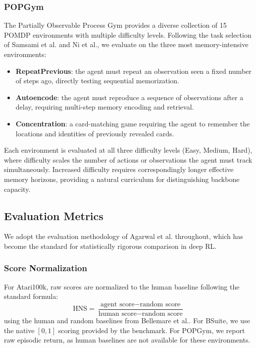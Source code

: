 \documentclass{article}
\begin{document}
\subsubsection{POPGym}
The Partially Observable Process Gym\cite{popgym} provides a diverse
collection of 15 POMDP environments with multiple difficulty levels.
Following the task selection of Samsami et al.\cite{memory} and Ni
et al., we evaluate on the three most memory-intensive environments:
\begin{itemize}
    \item \textbf{RepeatPrevious}: the agent must repeat an
          observation seen a fixed number of steps ago, directly
          testing sequential memorization.
    \item \textbf{Autoencode}: the agent must reproduce a sequence of
          observations after a delay, requiring multi-step memory
          encoding and retrieval.
    \item \textbf{Concentration}: a card-matching game requiring the
          agent to remember the locations and identities of
          previously revealed cards.
\end{itemize}
Each environment is evaluated at all three difficulty levels (Easy,
Medium, Hard), where difficulty scales the number of actions or
observations the agent must track simultaneously. Increased
difficulty requires correspondingly longer effective memory horizons,
providing a natural curriculum for distinguishing backbone capacity.

\subsection{Evaluation Metrics}
We adopt the evaluation methodology of Agarwal et al.\cite{rliable}
throughout, which has become the standard for statistically rigorous
comparison in deep RL.

\subsubsection{Score Normalization}
For Atari100k, raw scores are normalized to the human baseline
following the standard formula:
\[
    \text{HNS} = \frac{\text{agent score} -
    \text{random score}}{\text{human score} - \text{random score}}
\]
using the human and random baselines from Bellemare et
al.\cite{atari}. For BSuite, we use the native $[0,1]$ scoring
provided by the benchmark. For POPGym, we report raw episodic return,
as human baselines are not available for these environments.
\end{document}
